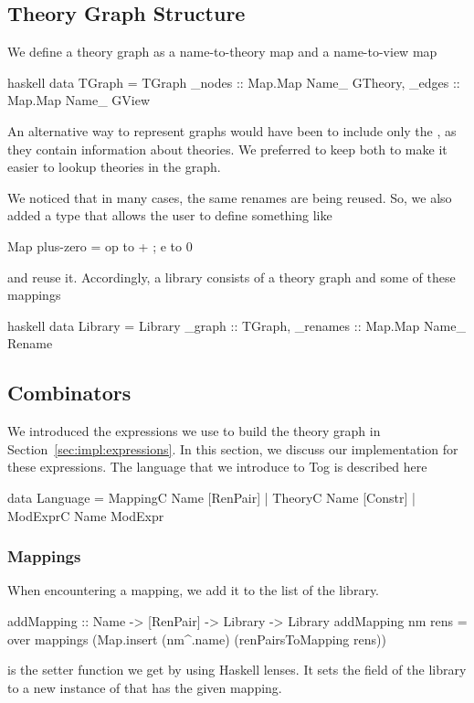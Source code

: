 \subsection{Theory Graph Structure}
We define a theory graph as a name-to-theory map and a name-to-view map 
\begin{hscode}{haskell}
data TGraph = TGraph { 
  _nodes :: Map.Map Name_ GTheory,
  _edges :: Map.Map Name_ GView } 
\end{hscode}
An alternative way to represent graphs would have been to include only the , as they contain information about theories. We preferred to keep both to make it easier to lookup theories in the graph. 

We noticed that in many cases, the same renames are being reused. So, we also added a  type that allows the user to define something like 
\begin{hscode}
Map plus-zero = {op to + ; e to 0}
\end{hscode}
and reuse it. Accordingly, a library consists of a theory graph and some of these mappings 
\begin{hscode}{haskell}
data Library = Library {
  _graph   :: TGraph,
  _renames :: Map.Map Name_ Rename }
\end{hscode}

\subsection{Combinators}
We introduced the expressions we use to build the theory graph in Section~\ref{sec:impl:expressions}. In this section, we discuss our implementation for these expressions. The language that we introduce to Tog is described here 
\begin{togcode}
data Language = 
    MappingC Name [RenPair]
  | TheoryC Name [Constr]
  | ModExprC Name ModExpr
\end{togcode}

\subsubsection{Mappings}
When encountering a mapping, we add it to the  list of the library. 
\begin{hscode}
addMapping :: Name -> [RenPair] -> Library -> Library
addMapping nm rens = 
   over mappings (Map.insert (nm^.name) (renPairsToMapping rens))
\end{hscode}
 is the setter function we get by using Haskell lenses. It sets the  field of the library to a new instance of  that has the given mapping. 


